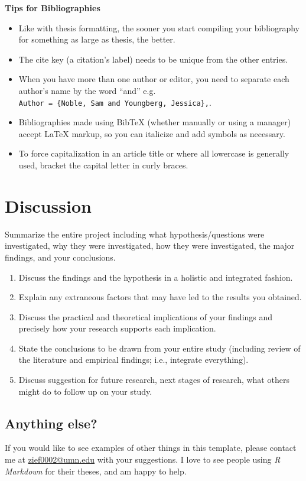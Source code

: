 \documentclass[12pt,letterpaper,oneside,oldfontcommands]{memoir}
\providecommand{\tightlist}{%
  \setlength{\itemsep}{0pt}\setlength{\parskip}{0pt}}
\theoremstyle{definition}
\theoremstyle{definition}
\theoremstyle{definition}
\theoremstyle{remark}
\begin{document}
\textbf{Tips for Bibliographies}

\begin{itemize}
\tightlist
\item
  Like with thesis formatting, the sooner you start compiling your
  bibliography for something as large as thesis, the better.
\item
  The cite key (a citation's label) needs to be unique from the other
  entries.
\item
  When you have more than one author or editor, you need to separate
  each author's name by the word ``and'' e.g.
  \texttt{Author\ =\ \{Noble,\ Sam\ and\ Youngberg,\ Jessica\},}.
\item
  Bibliographies made using BibTeX (whether manually or using a manager)
  accept LaTeX markup, so you can italicize and add symbols as
  necessary.
\item
  To force capitalization in an article title or where all lowercase is
  generally used, bracket the capital letter in curly braces.
\end{itemize}

\hypertarget{discussion}{%
\chapter{Discussion}\label{discussion}}

Summarize the entire project including what hypothesis/questions were
investigated, why they were investigated, how they were investigated,
the major findings, and your conclusions.

\begin{enumerate}
\def\labelenumi{\arabic{enumi}.}
\tightlist
\item
  Discuss the findings and the hypothesis in a holistic and integrated
  fashion.
\item
  Explain any extraneous factors that may have led to the results you
  obtained.
\item
  Discuss the practical and theoretical implications of your findings
  and precisely how your research supports each implication.
\item
  State the conclusions to be drawn from your entire study (including
  review of the literature and empirical findings; i.e., integrate
  everything).
\item
  Discuss suggestion for future research, next stages of research, what
  others might do to follow up on your study.
\end{enumerate}

\hypertarget{anything-else}{%
\section{Anything else?}\label{anything-else}}

If you would like to see examples of other things in this template,
please contact me at \url{zief0002@umn.edu} with your suggestions. I
love to see people using \emph{R Markdown} for their theses, and am
happy to help.


\end{document}
